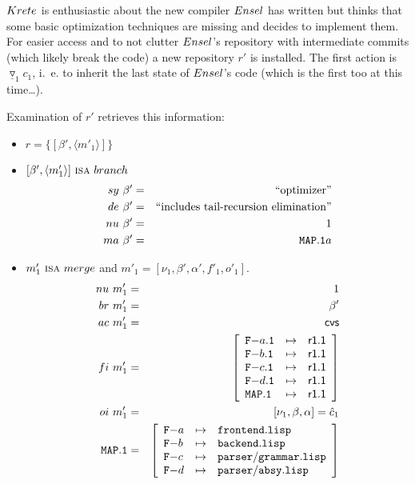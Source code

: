 \documentclass[fleqn, 10pt, a4paper]{article}
\begin{document}
$\mathnormal{Krete}$ is enthusiastic about the new compiler
$\mathnormal{Ensel}$ has written but thinks that some basic
optimization techniques are missing and decides to implement
them. For easier access and to not clutter $\mathnormal{Ensel}$'s
repository with intermediate commits (which likely break the code)
a new repository $r'$ is installed. The first action is
$\underline{\triangledown}_1 c_1$, i.~e. to inherit the last
state of $\mathnormal{Ensel}$'s code (which is the first too at
this time\ldots).

Examination of $r'$ retrieves this information:

\begin{itemize}
\item $r=\{[\beta', \langle m'_1\rangle]\}$
\item $[\beta',\langle m'_1\rangle]\ \mbox{\textsc{isa}}\ \mathnormal{branch}$
\begin{eqnarray*}
\mathnormal{sy}\ \beta' &=& \mbox{``optimizer''} \\
\mathnormal{de}\ \beta' &=& \mbox{``includes tail-recursion elimination''} \\
\mathnormal{nu}\ \beta' &=& 1 \\
\mathnormal{ma}\ \beta' &=& \mathtt{MAP.1}a
\end{eqnarray*}

\item $m'_1\ \mbox{\textsc{isa}}\ \mathnormal{merge}$ and
$m'_1=[\nu_1, \beta', \alpha', f'_1, o'_1]$.
\begin{eqnarray*}
\mathnormal{nu}\ m'_1 &=& 1 \\
\mathnormal{br}\ m'_1 &=& \beta' \\
\mathnormal{ac}\ m'_1 &=& \mathsf{cvs} \\
\mathnormal{fi}\ m'_1 &=& \left[
\begin{array}{lcl}
\mathtt{F-}a\mathtt{.1} & \mapsto & \mathsf{r1.1} \\
\mathtt{F-}b\mathtt{.1} & \mapsto & \mathsf{r1.1} \\
\mathtt{F-}c\mathtt{.1} & \mapsto & \mathsf{r1.1} \\
\mathtt{F-}d\mathtt{.1} & \mapsto & \mathsf{r1.1} \\
\mathtt{MAP.1}         & \mapsto & \mathsf{r1.1} \\
\end{array}\right] \\
\mathnormal{oi}\ m'_1 &=& [\nu_1, \beta, \alpha] = \hat c_1 \\
\mathtt{MAP.1} &=& \left[
\begin{array}{lcl}
\mathtt{F-}a &\mapsto& \mathtt{frontend.lisp} \\
\mathtt{F-}b &\mapsto& \mathtt{backend.lisp} \\
\mathtt{F-}c &\mapsto& \mathtt{parser/grammar.lisp} \\
\mathtt{F-}d &\mapsto& \mathtt{parser/absy.lisp} \\
\end{array}\right]
\end{eqnarray*}
\end{itemize}
\end{document}
